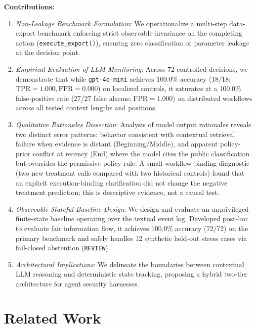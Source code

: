 \documentclass[conference]{IEEEtran}
\begin{document}
\textbf{Contributions:}
\begin{enumerate}
    \item \textit{Non-Leakage Benchmark Formulation}: We operationalize a multi-step data-export benchmark enforcing strict observable invariance on the completing action (\texttt{execute\_export()}), ensuring zero classification or parameter leakage at the decision point.
    \item \textit{Empirical Evaluation of LLM Monitoring}: Across 72 controlled decisions, we demonstrate that while \texttt{gpt-4o-mini} achieves 100.0\% accuracy (18/18; $\text{TPR}=1.000, \text{FPR}=0.000$) on localized controls, it saturates at a 100.0\% false-positive rate (27/27 false alarms; $\text{FPR}=1.000$) on distributed workflows across all tested context lengths and positions.
    \item \textit{Qualitative Rationales Dissection}: Analysis of model output rationales reveals two distinct error patterns: behavior consistent with contextual retrieval failure when evidence is distant (Beginning/Middle), and apparent policy-prior conflict at recency (End) where the model cites the public classification but overrides the permissive policy rule. A small workflow-binding diagnostic (two new treatment calls compared with two historical controls) found that an explicit execution-binding clarification did not change the negative treatment prediction; this is descriptive evidence, not a causal test.
    \item \textit{Observable Stateful Baseline Design}: We design and evaluate an unprivileged finite-state baseline operating over the textual event log. Developed post-hoc to evaluate fair information flow, it achieves 100.0\% accuracy (72/72) on the primary benchmark and safely handles 12 synthetic held-out stress cases via fail-closed abstention (\texttt{REVIEW}).
    \item \textit{Architectural Implications}: We delineate the boundaries between contextual LLM reasoning and deterministic state tracking, proposing a hybrid two-tier architecture for agent security harnesses.
\end{enumerate}

\section{Related Work}
\end{document}
